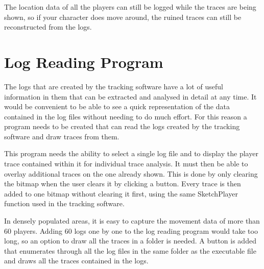 The location data of all the players can still be logged while the traces are being shown, so if your character does move around, the ruined traces can still be reconstructed from the logs.






\section{Log Reading Program}

The logs that are created by the tracking software have a lot of useful information in them that can be extracted and analysed in detail at any time. It would be convenient to be able to see a quick representation of the data contained in the log files without needing to do much effort. For this reason a program needs to be created that can read the logs created by the tracking software and draw traces from them. 

This program needs the ability to select a single log file and to display the player trace contained within it for individual trace analysis. It must then be able to overlay additional traces on the one already shown. This is done by only clearing the bitmap when the user clears it by clicking a button. Every trace is then added to one bitmap without clearing it first, using the same SketchPlayer function used in the tracking software.

In densely populated areas, it is easy to capture the movement data of more than 60 players. Adding 60 logs one by one to the log reading program would take too long, so an option to draw all the traces in a folder is needed. A button is added that enumerates through all the log files in the same folder as the executable file and draws all the traces contained in the logs.



